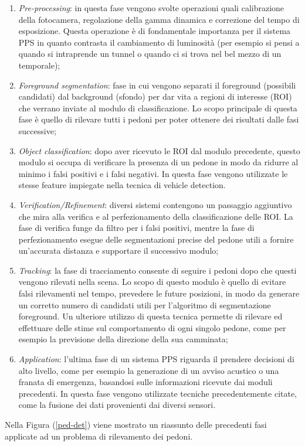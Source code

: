 \begin{enumerate}
    \item \emph{Pre-processing}: in questa fase vengono svolte operazioni quali calibrazione 
    della fotocamera, regolazione della gamma dinamica e correzione 
    del tempo di esposizione. Questa operazione è di fondamentale importanza 
    per il sistema PPS in quanto contrasta il cambiamento di 
    luminosità (per esempio si pensi a quando si intraprende un tunnel o 
    quando ci si trova nel bel mezzo di un temporale);
    \item \emph{Foreground segmentation}: fase in cui vengono separati il foreground 
    (possibili candidati) dal background (sfondo) per dar vita a regioni di 
    interesse (ROI) che verrano inviate al modulo di classificazione. Lo 
    scopo principale di questa fase è quello di rilevare tutti i pedoni per 
    poter ottenere dei risultati dalle fasi successive;
    \item \emph{Object classification}: dopo aver ricevuto le ROI dal modulo precedente, 
    questo modulo si occupa di verificare la presenza di un pedone 
    in modo da ridurre al minimo i falsi positivi e i falsi negativi. In 
    questa fase vengono utilizzate le stesse feature impiegate nella tecnica 
    di vehicle detection. 
    \item \emph{Verification/Refinement}: diversi sistemi contengono un passaggio aggiuntivo 
    che mira alla verifica e al perfezionamento della classificazione 
    delle ROI. La fase di verifica funge da filtro per i falsi positivi, mentre 
    la fase di perfezionamento esegue delle segmentazioni precise del 
    pedone utili a fornire un'accurata distanza e supportare il successivo 
    modulo;
    \item \emph{Tracking}: la fase di tracciamento consente di seguire i pedoni dopo che 
    questi vengono rilevati nella scena. Lo scopo di questo modulo è quello 
    di evitare falsi rilevamenti nel tempo, prevedere le future posizioni, in 
    modo da generare un corretto numero di candidati utili per l'algoritmo 
    di segmentazione foreground. Un ulteriore utilizzo di questa tecnica 
    permette di rilevare ed effettuare delle stime sul comportamento di 
    ogni singolo pedone, come per esempio la previsione della direzione 
    della sua camminata;
    \item \emph{Application}: l'ultima fase di un sistema PPS riguarda il prendere 
    decisioni di alto livello, come per esempio la generazione di un avviso 
    acustico o una franata di emergenza, basandosi sulle informazioni 
    ricevute dai moduli precedenti. In questa fase vengono utilizzate 
    tecniche precedentemente citate, come la fusione dei dati provenienti 
    dai diversi sensori.
\end{enumerate}
Nella Figura (\ref{ped-det}) viene mostrato un riassunto delle precedenti fasi 
applicate ad un problema di rilevamento dei pedoni.

